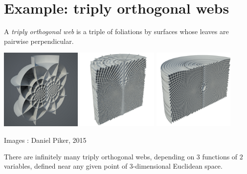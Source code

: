 \section{Example: triply orthogonal webs}\label{page:triply.orthogonal.web}
A \emph{triply orthogonal web} is a triple of foliations by surfaces whose leaves are pairwise perpendicular.
\bigskip
\begin{list}{}{%
\setlength{\topsep}{0pt}%
    \setlength{\leftmargin}{-.5cm}%
    \setlength{\rightmargin}{0pt}%
    \setlength{\listparindent}{\parindent}%
    \setlength{\itemindent}{\parindent}%
    \setlength{\parsep}{\parskip}%
}%
\item[]
\includegraphics[width=4cm]{triply-orthogonal}
\includegraphics[width=4cm]{triply-orthogonal-web-2b}
\includegraphics[width=4cm]{triply-orthogonal-web-3}
\par\centering
{\small{Images%
: Daniel Piker, 2015}}\end{list}
\bigskip
\begin{theorem}
There are infinitely many triply orthogonal webs, depending on \(3\) functions of \(2\) variables, defined near any given point of \(3\)-dimensional Euclidean space.
\end{theorem}
